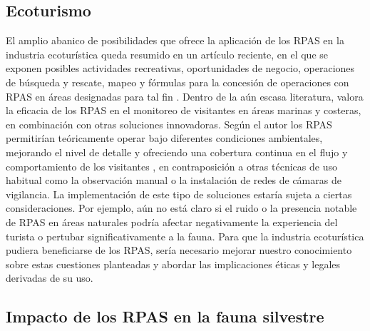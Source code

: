 \documentclass[twocolumn]{extarticle}
\begin{document}
\subsection{Ecoturismo}\label{ecoturismo}

El amplio abanico de posibilidades que ofrece la aplicación de los RPAS
en la industria ecoturística queda resumido en un artículo reciente, en
el que se exponen posibles actividades recreativas, oportunidades de
negocio, operaciones de búsqueda y rescate, mapeo y fórmulas para la
concesión de operaciones con RPAS en áreas designadas para tal fin
\citep{King2014}. Dentro de la aún escasa literatura, \citep{Hansen2016}
valora la eficacia de los RPAS en el monitoreo de visitantes en áreas
marinas y costeras, en combinación con otras soluciones innovadoras.
Según el autor los RPAS permitirían teóricamente operar bajo diferentes
condiciones ambientales, mejorando el nivel de detalle y ofreciendo una
cobertura continua en el flujo y comportamiento de los visitantes , en
contraposición a otras técnicas de uso habitual como la observación
manual o la instalación de redes de cámaras de vigilancia. La
implementación de este tipo de soluciones estaría sujeta a ciertas
consideraciones. Por ejemplo, aún no está claro si el ruido o la
presencia notable de RPAS en áreas naturales podría afectar
negativamente la experiencia del turista o pertubar significativamente a
la fauna. Para que la industria ecoturística pudiera beneficiarse de los
RPAS, sería necesario mejorar nuestro conocimiento sobre estas
cuestiones planteadas y abordar las implicaciones éticas y legales
derivadas de su uso.

\subsection{Impacto de los RPAS en la fauna
silvestre}\label{impacto-de-los-rpas-en-la-fauna-silvestre}
\end{document}
